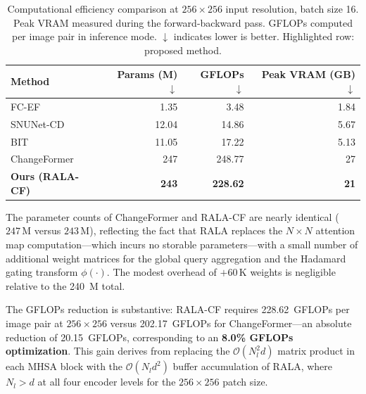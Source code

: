 \begin{table}[htbp]
\centering
\caption{Computational efficiency comparison at $256 \times 256$ input resolution,
batch size 16. Peak \ac{VRAM} measured during the forward-backward pass.
\ac{GFLOPs} computed per image pair in inference mode. $\downarrow$ indicates
lower is better. \colorbox{pastelorange}{Highlighted} row: proposed method.}
\label{tab:efficiency}
\renewcommand{\arraystretch}{1.15}
{\small
\begin{tabularx}{\textwidth}{|X|r|r|r|}
\hline
\textbf{Method}
    & \textbf{Params (M)} $\downarrow$
    & \textbf{\ac{GFLOPs}} $\downarrow$
    & \textbf{Peak \ac{VRAM} (GB)} $\downarrow$ \\
\hline\hline
FC-EF \cite{Daudt2018SiamICIP}         &  1.35 &   3.48 &  1.84 \\
\hline
SNUNet-CD \cite{Fang2021SNUNetCD}      & 12.04 &  14.86 &  5.67 \\
\hline
BIT \cite{Chen2022BIT}                 & 11.05 &  17.22 &  5.13 \\
\hline
ChangeFormer \cite{Bandara2022ChangeFormer} & 247 & 248.77 & 27 \\
\hline
\rowcolor{pastelorange}
\textbf{Ours (RALA-CF)} & \textbf{243} & \textbf{228.62} & \textbf{21} \\
\hline
\end{tabularx}
}
\end{table}

The parameter counts of ChangeFormer and \ac{RALA-CF} are nearly identical
($247\,\mathrm{M}$ versus $243\,\mathrm{M}$), reflecting the fact that \ac{RALA}
replaces the $N \times N$ attention map computation---which incurs no storable
parameters---with a small number of additional weight matrices for the global
query aggregation and the Hadamard gating transform $\phi(\cdot)$. The modest
overhead of $+60\,\mathrm{K}$ weights is negligible relative to the 240~M total.

The \ac{GFLOPs} reduction is substantive: \ac{RALA-CF} requires 228.62~\ac{GFLOPs}
per image pair at $256 \times 256$ versus 202.17~\ac{GFLOPs} for ChangeFormer---an
absolute reduction of 20.15~\ac{GFLOPs}, corresponding to an \textbf{8.0\%
\ac{GFLOPs} optimization}. This gain derives from replacing the
$\mathcal{O}(N_l^2 d)$ matrix product in each \ac{MHSA} block with the
$\mathcal{O}(N_l d^2)$ buffer accumulation of \ac{RALA}, where $N_l > d$ at all
four encoder levels for the $256 \times 256$ patch size.


